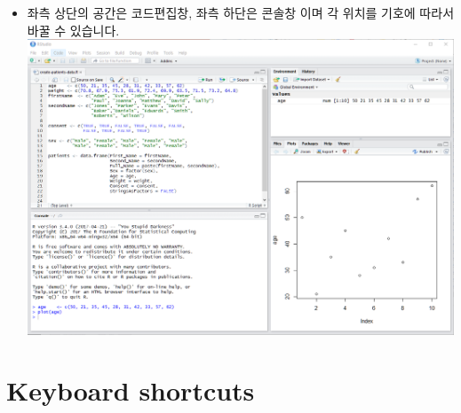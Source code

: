 \documentclass[
]{book}
\providecommand{\tightlist}{%
  \setlength{\itemsep}{0pt}\setlength{\parskip}{0pt}}
\begin{document}
\begin{itemize}
\tightlist
\item
  좌측 상단의 공간은 코드편집창, 좌측 하단은 콘솔창 이며 각 위치를 기호에 따라서 바꿀 수 있습니다.
  \includegraphics{images/01/01-11.PNG}
\end{itemize}

\hypertarget{keyboard-shortcuts}{%
\section{Keyboard shortcuts}\label{keyboard-shortcuts}}
\end{document}
